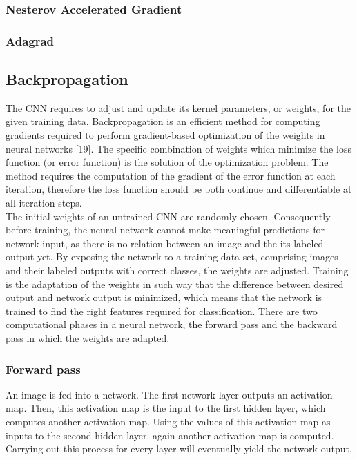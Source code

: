     \subsubsection{Nesterov Accelerated Gradient}
    \subsubsection{Adagrad}
    \subsection{Backpropagation}
    The CNN requires to adjust and update its kernel parameters, or weights, for the given training data. Backpropagation\cite{werbos1990backpropagation} is an efficient method for computing gradients required to perform gradient-based optimization of the weights in neural networks [19]. The specific combination of weights which minimize the loss function (or error function) is the solution of the optimization problem. The method requires the computation of the gradient of the error function at each iteration, therefore the loss function should be both continue and differentiable at all iteration steps.\\

    The initial weights of an untrained CNN are randomly chosen. Consequently before training, the neural network cannot make meaningful predictions for network input, as there is no relation between an image and the its labeled output yet. By exposing the network to a training data set, comprising images and their labeled outputs with correct classes, the weights are adjusted. Training is the adaptation of the weights in such way that the difference between desired output and network output is minimized, which means that the network is trained to find the right features required for classification. There are two computational phases in a neural network, the forward pass and the backward pass in which the weights are adapted.

    \subsubsection{Forward pass}
    An image is fed into a network. The first network layer outputs an activation map. Then, this activation map is the input to the first hidden layer, which computes another activation map. Using the values of this activation map as inputs to the second hidden layer, again another activation map is computed. Carrying out this process for every layer will eventually yield the network output.

